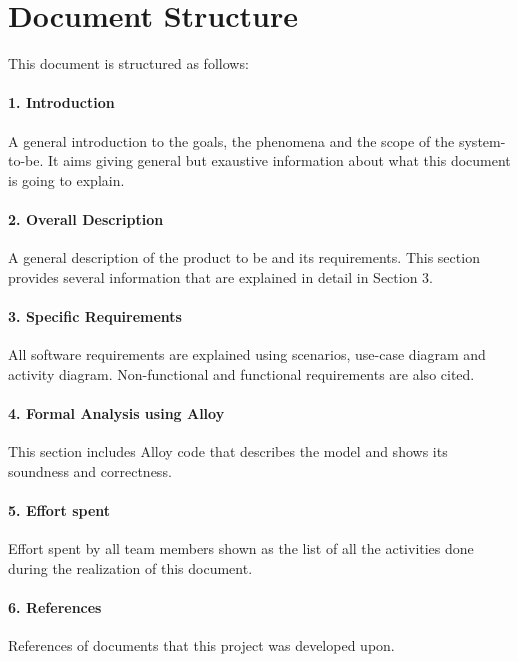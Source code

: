 \documentclass[../RASD.tex]{subfiles}
\begin{document}
		\section{Document Structure}
		This document is structured as follows:
		\paragraph{1. Introduction}
		A general introduction to the goals, the phenomena and the scope of the system-to-be. It aims giving general but exaustive information about what this document is going to explain.
		\paragraph{2. Overall Description}
		A general description of the product to be and its requirements. This section provides several information that are explained in detail in Section 3.
		\paragraph{3. Specific Requirements}
		All software requirements are explained using scenarios, use-case diagram and activity diagram. Non-functional and functional requirements are also cited.
		\paragraph{4. Formal Analysis using Alloy}
		This section includes Alloy code that describes the model and shows its soundness and correctness.
		\paragraph{5. Effort spent}
		Effort spent by all team members shown as the list of all the activities done during the realization of this document.
		\paragraph{6. References}
		References of documents that this project was developed upon.

		
\end{document}
